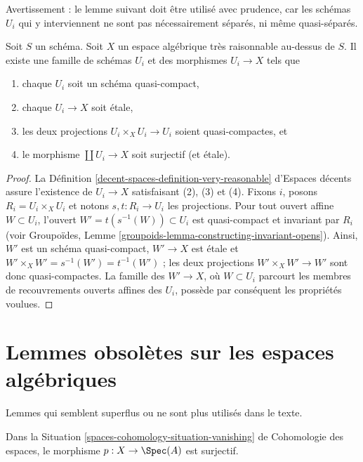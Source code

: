 \noindent
Avertissement : le lemme suivant doit être utilisé avec prudence, car les
schémas $U_i$ qui y interviennent ne sont pas nécessairement séparés, ni même
quasi-séparés.

\begin{lemma}
\label{lemma-very-reasonable-quasi-compact-pieces}
Soit $S$ un schéma.
Soit $X$ un espace algébrique très raisonnable au-dessus de $S$.
Il existe une famille de schémas
$U_i$ et des morphismes $U_i \to X$ tels que
\begin{enumerate}
\item chaque $U_i$ soit un schéma quasi-compact,
\item chaque $U_i \to X$ soit étale,
\item les deux projections $U_i \times_X U_i \to U_i$ soient quasi-compactes, et
\item le morphisme $\coprod U_i \to X$ soit surjectif (et étale).
\end{enumerate}
\end{lemma}

\begin{proof}
La Définition \ref{decent-spaces-definition-very-reasonable} d'Espaces décents
assure l'existence de $U_i \to X$ satisfaisant (2), (3) et (4).
Fixons $i$, posons $R_i = U_i \times_X U_i$ et notons $s, t : R_i \to U_i$
les projections.
Pour tout ouvert affine $W \subset U_i$, l'ouvert $W' = t(s^{-1}(W)) \subset U_i$
est quasi-compact et invariant par $R_i$ (voir
Groupoïdes, Lemme \ref{groupoids-lemma-constructing-invariant-opens}).
Ainsi, $W'$ est un schéma quasi-compact, $W' \to X$ est étale et
$W' \times_X W' = s^{-1}(W') = t^{-1}(W')$ ; les deux projections
$W' \times_X W' \to W'$ sont donc quasi-compactes. La famille des
$W' \to X$, où $W \subset U_i$ parcourt les membres de recouvrements ouverts
affines des $U_i$, possède par conséquent les propriétés voulues.
\end{proof}




\section{Lemmes obsolètes sur les espaces algébriques}
\label{section-obsolete-on-spaces}

\noindent
Lemmes qui semblent superflus ou ne sont plus utilisés dans le texte.

\begin{lemma}
\label{lemma-vanishing-surjective}
Dans la Situation \ref{spaces-cohomology-situation-vanishing} de Cohomologie des espaces,
le morphisme $p : X \to \Spec(A)$ est surjectif.
\end{lemma}

